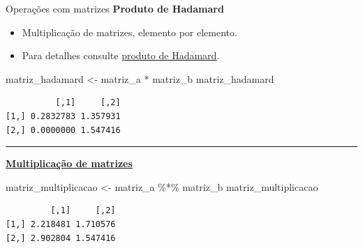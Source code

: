 \documentclass[
  10pt,
  ignorenonframetext,
]{beamer}
\newenvironment{Shaded}{\begin{snugshade}}{\end{snugshade}}
\newcommand{\NormalTok}[1]{\textcolor[rgb]{0.00,0.23,0.31}{#1}}
\newcommand{\OtherTok}[1]{\textcolor[rgb]{0.00,0.23,0.31}{#1}}
\newcommand{\SpecialCharTok}[1]{\textcolor[rgb]{0.37,0.37,0.37}{#1}}
\providecommand{\tightlist}{%
  \setlength{\itemsep}{0pt}\setlength{\parskip}{0pt}}\usepackage{longtable,booktabs,array}
\newcommand*{\regrafina}{\rule{\textwidth}{0.5pt}}
\begin{document}
\begin{frame}[fragile]{Operações com matrizes}
\protect\hypertarget{operauxe7uxf5es-com-matrizes-1}{}
\textbf{Produto de Hadamard}

\begin{itemize}
\tightlist
\item
  Multiplicação de matrizes, elemento por elemento.
\item
  Para detalhes consulte
  \href{https://en.wikipedia.org/wiki/Hadamard_product_(matrices)}{produto
  de Hadamard}.
\end{itemize}

\begin{Shaded}
\begin{Highlighting}[]
\NormalTok{matriz\_hadamard }\OtherTok{\textless{}{-}}\NormalTok{ matriz\_a }\SpecialCharTok{*}\NormalTok{ matriz\_b}
\NormalTok{matriz\_hadamard}
\end{Highlighting}
\end{Shaded}

\begin{verbatim}
          [,1]     [,2]
[1,] 0.2832783 1.357931
[2,] 0.0000000 1.547416
\end{verbatim}

\regrafina

\href{https://pt.wikipedia.org/wiki/Matriz_inversa}{\textbf{Multiplicação
de matrizes}}

\begin{Shaded}
\begin{Highlighting}[]
\NormalTok{matriz\_multiplicacao }\OtherTok{\textless{}{-}}\NormalTok{ matriz\_a }\SpecialCharTok{\%*\%}\NormalTok{ matriz\_b}
\NormalTok{matriz\_multiplicacao}
\end{Highlighting}
\end{Shaded}

\begin{verbatim}
         [,1]     [,2]
[1,] 2.218481 1.710576
[2,] 2.902804 1.547416
\end{verbatim}
\end{frame}
\end{document}
